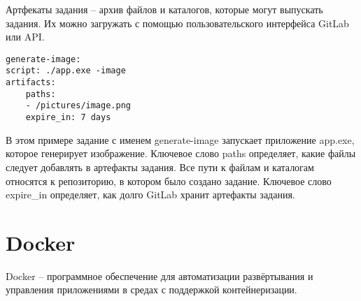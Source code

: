 \begin{itemize}
	Артфекаты задания -- архив файлов и каталогов, которые могут выпускать задания. Их можно загружать с помощью пользовательского интерфейса GitLab или API.
	
	\begin{lstlisting}[caption={Пример создания артефактов задания}]
generate-image:
script: ./app.exe -image 
artifacts:
	paths:
	- /pictures/image.png
	expire_in: 7 days
	\end{lstlisting}

	В этом примере задание с именем generate-image запускает приложение app.exe, которое генерирует изображение. Ключевое слово paths определяет, какие файлы следует добавлять
	в артефакты задания. Все пути к файлам и каталогам относятся к репозиторию, в котором было создано задание. Ключевое слово expire\_in определяет, как долго GitLab хранит артефакты задания.
	
\end{itemize}
\section{Docker}
Docker -- программное обеспечение для автоматизации развёртывания и управления приложениями в средах с  поддержкой контейнеризации.

